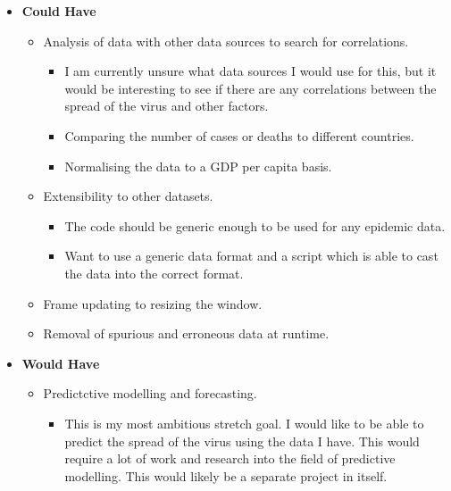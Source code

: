 \documentclass{report}
\begin{document}
\begin{itemize}
\begin{itemize}
    \end{itemize}
    \item \textbf{\Large{Could Have}}
    \begin{itemize}
        \item Analysis of data with other data sources to search for correlations.
        \begin{itemize}
            \item I am currently unsure what data sources I would use for this, but it would be interesting to see if there are any correlations between the spread of the virus and other factors.
            \item Comparing the number of cases or deaths to different countries.
            \item Normalising the data to a GDP per capita basis.
        \end{itemize}
        \item Extensibility to other datasets.
        \begin{itemize}
            \item The code should be generic enough to be used for any epidemic data.
            \item Want to use a generic data format and a script which is able to cast the data into the correct format.
        \end{itemize}
        \item Frame updating to resizing the window.
        \item Removal of spurious and erroneous data at runtime.
    \end{itemize}
    \item \textbf{\Large{Would Have}}
    \begin{itemize}
        \item Predictctive modelling and forecasting.
        \begin{itemize}
            \item This is my most ambitious stretch goal. I would like to be able to predict the spread of the virus using the data I have. This would require a lot of work and research into the field of predictive modelling. This would likely be a separate project in itself.
        \end{itemize}
    \end{itemize}
\end{itemize}
\newpage
\end{document}
